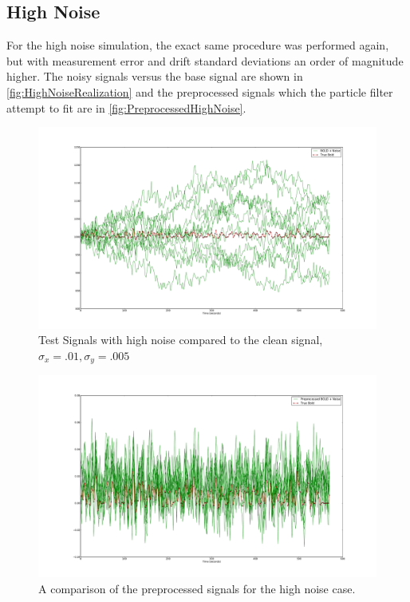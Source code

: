 \subsection{High Noise}
\label{sec:HighNoise}
For the high noise simulation, the exact same procedure was performed again, but with 
measurement error and drift standard
deviations an order of magnitude higher. The noisy signals versus the base signal are shown
in \autoref{fig:HighNoiseRealization} and the preprocessed signals which the particle
filter attempt to fit are in \autoref{fig:PreprocessedHighNoise}.
\begin{figure}[H]
\label{fig:LowNoiseRealization}
\includegraphics[trim=6cm 3cm 6cm 3cm,width=16cm]{images/realization_highnoise}
\caption{Test Signals with high noise compared to the clean signal, $\sigma_x = .01, \sigma_y=.005$}
\end{figure}
\begin{figure}[H]
\label{fig:PreprocessedHighNoise}
\includegraphics[trim=6cm 3cm 6cm 3cm,width=16cm]{images/preprocessed_highnoise}
\caption{A comparison of the preprocessed signals for the high noise case.}
\end{figure}

